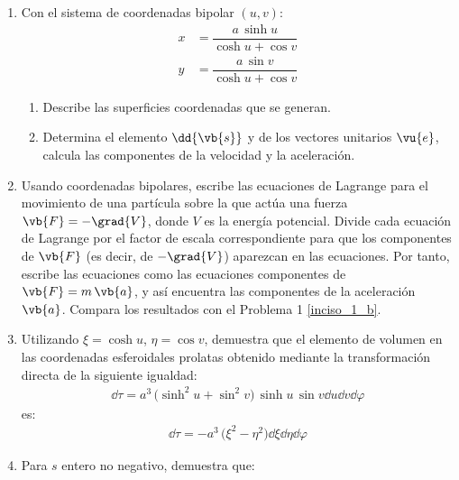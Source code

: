 \begin{enumerate}
\item Con el sistema de coordenadas bipolar $(u, v)$:
\begin{align*}
x &= \dfrac{a \, \sinh u}{\cosh u + \cos v} \\[0.5em]
y &= \dfrac{a \, \sin v}{\cosh u + \cos v}
\end{align*}
\begin{enumerate}[label=\alph*)]
\item Describe las superficies coordenadas que se generan.
\item \label{inciso_1_b} Determina el elemento $\dd{\vb{s}}$ y de los vectores unitarios $\vu{e}$, calcula las componentes de la velocidad y la aceleración.
\end{enumerate}
\item Usando coordenadas bipolares, escribe las ecuaciones de Lagrange para el movimiento de una partícula sobre la que actúa una fuerza $\vb{F} = - \grad{V}$, donde $V$ es la energía potencial. Divide cada ecuación de Lagrange por el factor de escala correspondiente para que los componentes de $\vb{F}$ (es decir, de $- \grad{V}$) aparezcan en las ecuaciones. Por tanto, escribe las ecuaciones como las ecuaciones componentes de $\vb{F} = m \, \vb{a}$, y así encuentra las componentes de la aceleración $\vb{a}$. Compara los resultados con el Problema 1 \ref{inciso_1_b}.
\item Utilizando $\xi = \cosh u$, $\eta = \cos v$, demuestra que el elemento de volumen en las coordenadas esferoidales prolatas obtenido mediante la transformación directa de la siguiente igualdad:
\begin{align*}
\dd{\tau} = a^{3} \, \big( \sinh^{2} u + \sin^{2} v \big) \, \sinh u \, \sin v \dd{u} \dd{v} \dd{\varphi}
\end{align*}
es:
\begin{align*}
\dd{\tau} = - a^{3} \, \big( \xi^{2} - \eta^{2} \big) \dd{\xi} \dd{\eta} \dd{\varphi}
\end{align*}
\item Para $s$ entero no negativo, demuestra que:

\end{enumerate}
